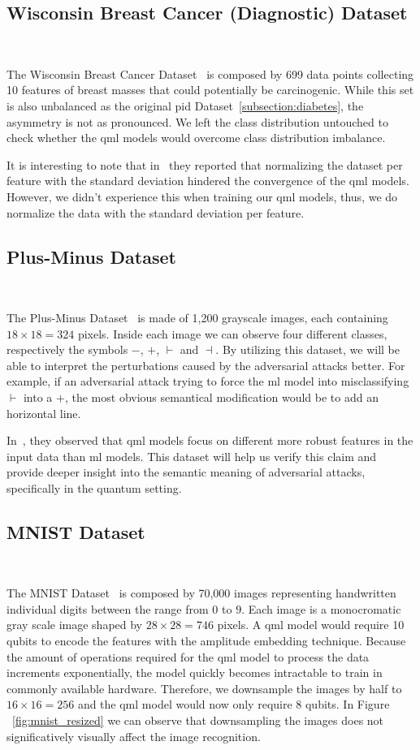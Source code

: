\subsection{Wisconsin Breast Cancer (Diagnostic) Dataset} \

The Wisconsin Breast Cancer Dataset~\cite{street_nuclear_1993} is
composed by 699 data points collecting 10 features of breast masses
that could potentially be carcinogenic. While this set is also
unbalanced as the original \ac{pid} Dataset~\ref{subsection:diabetes},
the asymmetry is not as pronounced. We left the class distribution
untouched to check whether the \ac{qml} models would overcome class
distribution imbalance. \

It is interesting to note that in~\cite{winderl_quantum_2023}
they reported that normalizing the dataset per feature with the
standard deviation hindered the convergence of the \ac{qml} models.
However, we didn't experience this when training our \ac{qml} models,
thus, we do normalize the data with the standard deviation per feature. \

\subsection{Plus-Minus Dataset} \

The Plus-Minus Dataset~\cite{wendlinger_comparative_2024} is made of
1,200 grayscale images, each containing \(18 \times 18 = 324\) pixels.
Inside each image we can observe four different classes, respectively
the symbols \(-\), \(+\), \(\vdash\) and \(\dashv\). By utilizing this
dataset, we will be able to interpret the perturbations caused by
the adversarial attacks better. For example, if an adversarial attack
trying to force the \ac{ml} model into misclassifying \(\vdash\) into
a \(+\), the most obvious semantical modification would be to add an
horizontal line. \

In~\cite{west_benchmarking_2023}, they observed that \ac{qml} models
focus on different more robust features in the input data than
\ac{ml} models. This dataset will help us verify this claim and
provide deeper insight into the semantic meaning of adversarial
attacks, specifically in the quantum setting. \

\subsection{MNIST Dataset} \

The MNIST Dataset~\cite{bottou_comparison_1994} is composed by
70,000 images representing handwritten individual digits between
the range from \(0\) to \(9\). Each image is a monocromatic gray scale
image shaped by \(28 \times 28 = 746\) pixels. A \ac{qml} model would
require 10 qubits to encode the features with the amplitude embedding
technique. Because the amount of operations required for the
\ac{qml} model to process the data increments exponentially, the model
quickly becomes intractable to train in commonly available hardware.
Therefore, we downsample the images by half to \(16 \times 16 = 256\) and
the \ac{qml} model would now only require 8 qubits. In Figure
~\ref{fig:mnist_resized} we can observe that downsampling the images
does not significatively visually affect the image recognition. \

